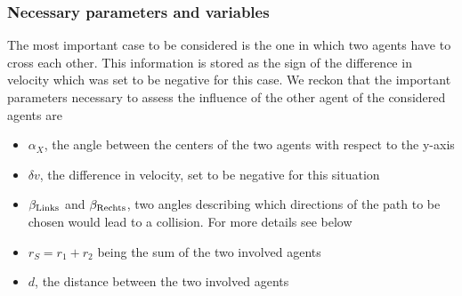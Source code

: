 \subsubsection{Necessary parameters and variables}
The most important case to be considered is the one in which two agents have to cross each other. This information is stored as the sign of the difference in velocity which was set to be negative for this case. We reckon that the important parameters necessary to assess the influence of the other agent of the considered agents are
\begin{itemize}
	\item $\alpha_X$, the angle between the centers of the two agents with respect to the y-axis
	\item $\delta v$, the difference in velocity, set to be negative for this situation
	\item $\beta_{\text{Links}}$ and $\beta_{\text{Rechts}}$, two angles describing which directions of the path to be chosen would lead to a collision. For more details see below
	\item $r_S = r_1 + r_2$ being the sum of the two involved agents
	\item $d$, the distance between the two involved agents
\end{itemize}






